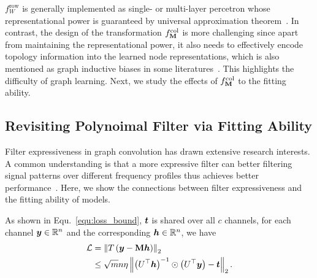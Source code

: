 \documentclass{article} %
\begin{document}
$f_W^{\mathrm{row}}$ is generally implemented as single- or multi-layer percetron whose representational power is guaranteed by universal approximation theorem~\citep{hornik1989multilayer,cybenko1989approximation}.
In contrast, the design of the transformation $f_{{\mathbf{M}}}^{\mathrm{col}}$ is more challenging since apart from maintaining the representational power, it also needs to effectively encode topology information into the learned node representations, which is also mentioned as graph inductive biases in some literatures~\citep{ma2023graph}.
This highlights the difficulty of graph learning.
Next, we study the effects of $f_{{\mathbf{M}}}^{\mathrm{col}}$ to the fitting ability.

\subsection{Revisiting Polynoimal Filter via Fitting Ability}
Filter expressiveness in graph convolution has drawn extensive research interests.
A common understanding is that a more expressive filter can better filtering signal patterns over different frequency profiles thus achieves better performance~\citep{chien2021adaptive,he2021bernnet,JacobiConv,yang2022spectrum,bo2022specformer}.
Here, we show the connections between filter expressiveness and the fitting ability of models.

As shown in Equ.~\ref{equ:loss_bound}, ${\bm{t}}$ is shared over all $c$ channels, for each channel ${\bm{y}}\in{\mathbb{R}}^n$ and the corresponding ${\bm{h}}\in{\mathbb{R}}^n$, we have
\begin{equation}
	\begin{aligned}
		{\mathcal{L}}&=\left\|T\left({\bm{y}}-{\mathbf{M}}{\bm{h}}\right)\right\|_2\\
		&\leq\sqrt{m}n\eta\left\|\left(U^{\top}{\bm{h}}\right)^{-1}\odot\left(U^{\top}{\bm{y}}\right)-{\bm{t}}\right\|_2.
	\end{aligned}
\end{equation}
\end{document}
